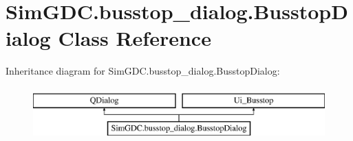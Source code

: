 \hypertarget{class_sim_g_d_c_1_1busstop__dialog_1_1_busstop_dialog}{}\section{Sim\+G\+D\+C.\+busstop\+\_\+dialog.\+Busstop\+Dialog Class Reference}
\label{class_sim_g_d_c_1_1busstop__dialog_1_1_busstop_dialog}
Inheritance diagram for Sim\+G\+D\+C.\+busstop\+\_\+dialog.\+Busstop\+Dialog\+:\begin{figure}[H]
\begin{center}
\leavevmode
\includegraphics[height=2.000000cm]{class_sim_g_d_c_1_1busstop__dialog_1_1_busstop_dialog}
\end{center}
\end{figure}

